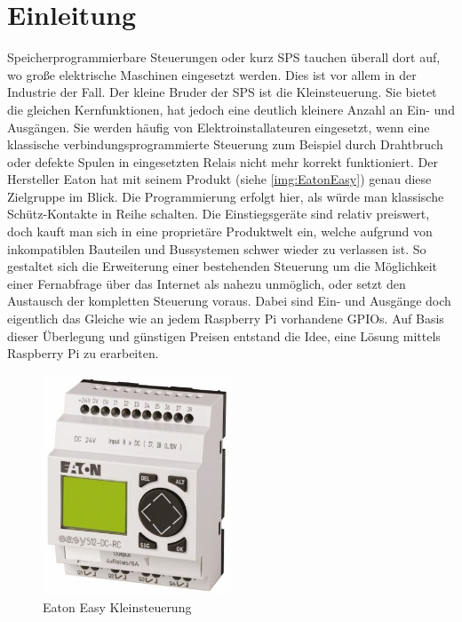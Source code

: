  \section{Einleitung}
 Speicherprogrammierbare Steuerungen oder kurz SPS tauchen überall dort auf, wo große elektrische Maschinen eingesetzt werden. Dies ist vor allem in der Industrie der Fall. Der kleine Bruder der SPS ist die Kleinsteuerung. Sie bietet die gleichen Kernfunktionen, hat jedoch eine deutlich kleinere Anzahl an Ein- und Ausgängen. Sie werden häufig von Elektroinstallateuren eingesetzt, wenn eine klassische verbindungsprogrammierte Steuerung zum Beispiel durch Drahtbruch oder defekte Spulen in eingesetzten Relais nicht mehr korrekt funktioniert. Der Hersteller Eaton hat mit seinem Produkt  (siehe \autoref{img:EatonEasy}) genau diese Zielgruppe im Blick. Die Programmierung erfolgt hier, als würde man klassische Schütz-Kontakte in Reihe schalten. Die Einstiegsgeräte sind relativ preiswert, doch kauft man sich in eine proprietäre Produktwelt ein, welche aufgrund von inkompatiblen Bauteilen und Bussystemen schwer wieder zu verlassen ist. So gestaltet sich die Erweiterung einer bestehenden Steuerung um die Möglichkeit einer Fernabfrage über das Internet als nahezu unmöglich, oder setzt den Austausch der kompletten Steuerung voraus. Dabei sind Ein- und Ausgänge doch eigentlich das Gleiche wie an jedem Raspberry Pi vorhandene GPIOs. Auf Basis dieser Überlegung und günstigen Preisen entstand die Idee, eine Lösung mittels Raspberry Pi zu erarbeiten. 
 
  \begin{figure}[H]
 	\begin{center}
 		\includegraphics[width=0.5\textwidth]{./images/Easy.jpg}
 		\caption[Eaton Easy Kleinsteuerung]{Eaton Easy Kleinsteuerung\cite{URL:EatonEasy}}
 		\label{img:EatonEasy}
 	\end{center} 
 \end{figure}	
 
